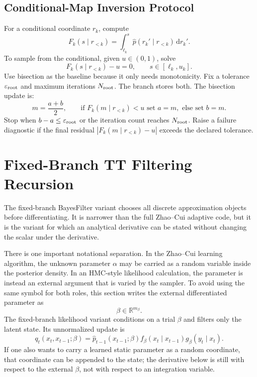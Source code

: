 \documentclass[11pt]{article}
\newcommand{\R}{\mathbb R}
\newcommand{\dd}{\,\mathrm d}
\begin{document}
\subsection{Conditional-Map Inversion Protocol}

For a conditional coordinate \(r_k\), compute
\[
    F_k(s\mid r_{<k})
    =
    \int_{\ell_k}^{s}\widehat p(r_k'\mid r_{<k})\dd r_k'.
\]
To sample from the conditional, given \(u\in(0,1)\), solve
\[
    F_k(s\mid r_{<k})-u=0,\qquad s\in[\ell_k,u_k].
\]
Use bisection as the baseline because it only needs monotonicity.  Fix a
tolerance \(\varepsilon_{\rm root}\) and maximum iterations \(N_{\rm root}\).
The branch stores both.  The bisection update is:
\[
    m=\frac{a+b}{2},\qquad
    \text{if }F_k(m\mid r_{<k})<u\text{ set }a=m,\text{ else set }b=m.
\]
Stop when \(b-a\le\varepsilon_{\rm root}\) or the iteration count reaches
\(N_{\rm root}\).  Raise a failure diagnostic if the final residual
\(|F_k(m\mid r_{<k})-u|\) exceeds the declared tolerance.

\section{Fixed-Branch TT Filtering Recursion}

The fixed-branch BayesFilter variant chooses all discrete approximation objects
before differentiating.  It is narrower than the full Zhao--Cui adaptive code,
but it is the variant for which an analytical derivative can be stated without
changing the scalar under the derivative.

There is one important notational separation.  In the Zhao--Cui learning
algorithm, the unknown parameter \(\alpha\) may be carried as a random variable
inside the posterior density.  In an HMC-style likelihood calculation, the
parameter is instead an external argument that is varied by the sampler.  To
avoid using the same symbol for both roles, this section writes the external
differentiated parameter as
\[
    \beta\in\R^{m_\beta}.
\]
The fixed-branch likelihood variant conditions on a trial \(\beta\) and filters
only the latent state.  Its unnormalized update is
\[
    q_t(x_t,x_{t-1};\beta)
    =
    \widehat p_{t-1}(x_{t-1};\beta)
    f_\beta(x_t\mid x_{t-1})
    g_\beta(y_t\mid x_t).
\]
If one also wants to carry a learned static parameter as a random coordinate,
that coordinate can be appended to the state; the derivative below is still
with respect to the external \(\beta\), not with respect to an integration
variable.
\end{document}
